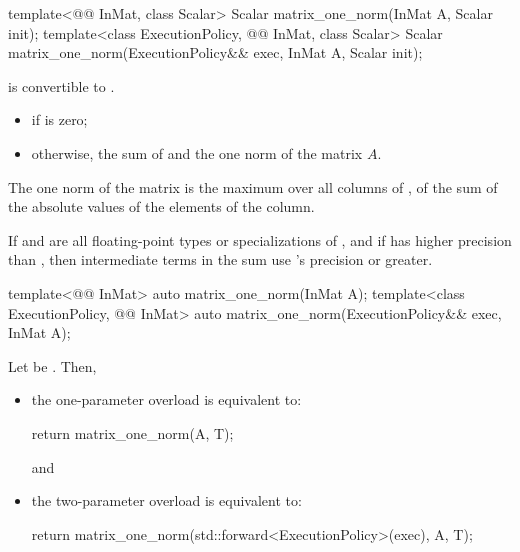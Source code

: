 \begin{itemdecl}
template<@@ InMat, class Scalar>
  Scalar matrix_one_norm(InMat A, Scalar init);
template<class ExecutionPolicy, @@ InMat, class Scalar>
  Scalar matrix_one_norm(ExecutionPolicy&& exec, InMat A, Scalar init);
\end{itemdecl}

\begin{itemdescr}
\pnum
\mandates
{}
is convertible to .

\pnum
\returns
\begin{itemize}
\item
{} if  is zero;
\item
otherwise, the sum of  and the one norm of the matrix $A$.
\end{itemize}
\begin{note}
The one norm of the matrix 
is the maximum over all columns of ,
of the sum of the absolute values of the elements of the column.
\end{note}

\pnum
\remarks
If  and 
are all floating-point types or specializations of ,
and if  has higher precision
than ,
then intermediate terms in the sum use 's precision or greater.
\end{itemdescr}

\begin{itemdecl}
template<@@ InMat>
  auto matrix_one_norm(InMat A);
template<class ExecutionPolicy, @@ InMat>
  auto matrix_one_norm(ExecutionPolicy&& exec, InMat A);
\end{itemdecl}

\begin{itemdescr}
\pnum
\effects
Let  be
.
Then,
\begin{itemize}
\item
the one-parameter overload is equivalent to:
\begin{codeblock}
return matrix_one_norm(A, T{});
\end{codeblock}
and
\item
the two-parameter overload is equivalent to:
\begin{codeblock}
return matrix_one_norm(std::forward<ExecutionPolicy>(exec), A, T{});
\end{codeblock}
\end{itemize}
\end{itemdescr}

